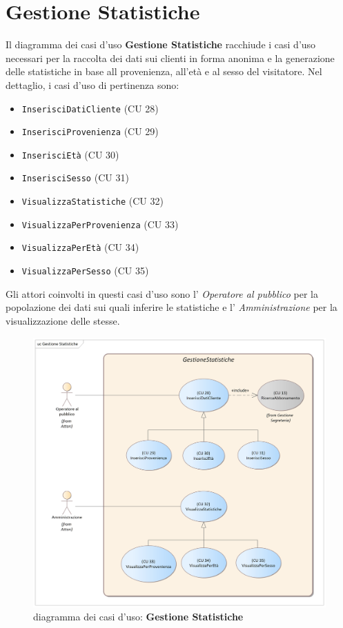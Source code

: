 \documentclass{article}
\begin{document}
\newpage 

\section{Gestione Statistiche}

\indent\indent Il diagramma dei casi d'uso \textbf{Gestione Statistiche} racchiude i casi d'uso necessari per la raccolta dei dati sui clienti in forma anonima e la generazione delle statistiche in base all provenienza, all'età e al sesso del visitatore. Nel dettaglio, i casi d'uso di pertinenza sono:
\medskip
\begin{itemize}[itemsep=4pt]
  \item \texttt{InserisciDatiCliente} (CU 28)
  \item \texttt{InserisciProvenienza} (CU 29)
  \item \texttt{InserisciEtà} (CU 30)
  \item \texttt{InserisciSesso} (CU 31)
  \item \texttt{VisualizzaStatistiche} (CU 32)
  \item \texttt{VisualizzaPerProvenienza} (CU 33)
  \item \texttt{VisualizzaPerEtà} (CU 34)
  \item \texttt{VisualizzaPerSesso} (CU 35)
\end{itemize}
\medskip
Gli attori coinvolti in questi casi d'uso sono l' \emph{Operatore al pubblico} per la popolazione dei dati sui quali inferire le statistiche e  l' \emph{Amministrazione} per la visualizzazione delle stesse.

\begin{figure}[h]
    \centering
    \includegraphics[width=1\textwidth]{Gestione Statistiche}
    \caption{diagramma dei casi d'uso: \textbf{Gestione Statistiche}}
    \label{fig:GestioneStatistiche}
\end{figure}
\end{document}
